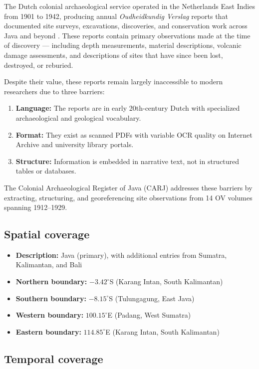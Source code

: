 \documentclass[11pt]{article}
\begin{document}
The Dutch colonial archaeological service operated in the Netherlands East Indies from 1901 to 1942, producing annual \textit{Oudheidkundig Verslag} reports that documented site surveys, excavations, discoveries, and conservation work across Java and beyond \citep{krom1923inleiding}. These reports contain primary observations made at the time of discovery --- including depth measurements, material descriptions, volcanic damage assessments, and descriptions of sites that have since been lost, destroyed, or reburied.

Despite their value, these reports remain largely inaccessible to modern researchers due to three barriers:
\begin{enumerate}
    \item \textbf{Language:} The reports are in early 20th-century Dutch with specialized archaeological and geological vocabulary.
    \item \textbf{Format:} They exist as scanned PDFs with variable OCR quality on Internet Archive and university library portals.
    \item \textbf{Structure:} Information is embedded in narrative text, not in structured tables or databases.
\end{enumerate}

The Colonial Archaeological Register of Java (CARJ) addresses these barriers by extracting, structuring, and georeferencing site observations from 14 OV volumes spanning 1912--1929.

\subsection{Spatial coverage}

\begin{itemize}
    \item \textbf{Description:} Java (primary), with additional entries from Sumatra, Kalimantan, and Bali
    \item \textbf{Northern boundary:} $-3.42^{\circ}$S (Karang Intan, South Kalimantan)
    \item \textbf{Southern boundary:} $-8.15^{\circ}$S (Tulungagung, East Java)
    \item \textbf{Western boundary:} $100.15^{\circ}$E (Padang, West Sumatra)
    \item \textbf{Eastern boundary:} $114.85^{\circ}$E (Karang Intan, South Kalimantan)
\end{itemize}

\subsection{Temporal coverage}
\end{document}
